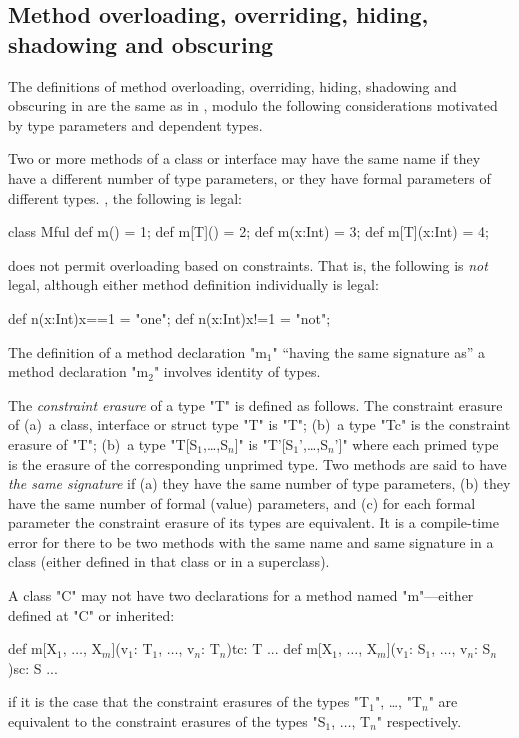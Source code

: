 \subsection{Method overloading, overriding, hiding, shadowing and obscuring}
\label{MethodOverload}

The definitions of method overloading, overriding, hiding, shadowing
and obscuring in \Xten{} are the same as in \Java, modulo the following
considerations motivated by type parameters and dependent types.

Two or more methods of a class or interface may have the same
name if they have a different number of type parameters, or
they have formal parameters of different types.  \Eg, the following is legal: 

%
\begin{xten}
class Mful{
   def m() = 1;
   def m[T]() = 2;
   def m(x:Int) = 3;
   def m[T](x:Int) = 4;
}
\end{xten}
%

\XtenCurrVer{} does not permit overloading based on constraints. That is, the
following is {\em not} legal, although either method definition individually
is legal:
\begin{xten}
   def n(x:Int){x==1} = "one";
   def n(x:Int){x!=1} = "not";
\end{xten}


The definition of a method declaration \xcdmath"m$_1$" ``having the same signature
as'' a method declaration \xcdmath"m$_2$" involves identity of types. 

The {\em constraint erasure} of a type \xcdmath"T" is defined as follows.
The constraint erasure of  (a)~a class, interface or struct type \xcdmath"T" is 
\xcdmath"T"; (b)~a type \xcdmath"T{c}" is the constraint erasure of 
\xcdmath"T"; (b)~a type \xcdmath"T[S$_1$,\ldots,S$_n$]" 
is \xcdmath"T'[S$_1$',\ldots,S$_n$']" where each primed type is the erasure of 
the corresponding unprimed type.
 Two methods are said to have {\em the
  same signature} if (a) they have the same number of type parameters,
(b) they have the same number of formal (value) parameters, and (c)
for each formal parameter the constraint erasure of its types are equivalent. It is a
compile-time error for there to be two methods with the same name and
same signature in a class (either defined in that class or in a
superclass).

\begin{staticrule*}
  A class \xcd"C" may not have two declarations for a method named \xcd"m"---either
  defined at \xcd"C" or inherited:
\begin{xtenmath}
def m[X$_1$, $\dots$, X$_m$](v$_1$: T$_1$, $\dots$, v$_n$: T$_n$){tc}: T {...}
def m[X$_1$, $\dots$, X$_m$](v$_1$: S$_1$, $\dots$, v$_n$: S$_n$){sc}: S {...}
\end{xtenmath}
\noindent
if it is the case that the constraint erasures of the types \xcdmath"T$_1$",
\dots, \xcdmath"T$_n$" are
equivalent to the constraint erasures of the types \xcdmath"S$_1$, $\dots$, T$_n$"
respectively.
\end{staticrule*}


